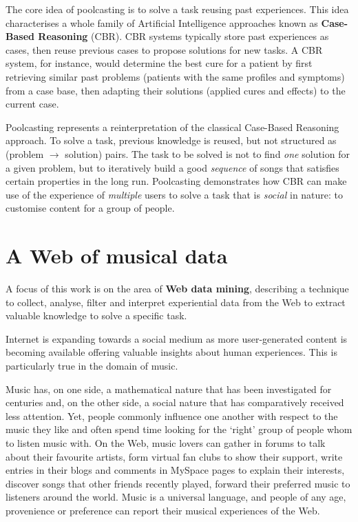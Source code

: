 The core idea of poolcasting is to solve a task reusing past experiences. This idea characterises a whole family of Artificial Intelligence approaches known as \textbf{Case-Based Reasoning} (CBR).
%
CBR systems typically store past experiences as cases, then reuse previous cases to propose solutions for new tasks.
A CBR system, for instance, would determine the best cure for a patient by first retrieving similar past problems (patients with the same profiles and symptoms) from a case base, then adapting their solutions (applied cures and effects) to the current case.

Poolcasting represents a reinterpretation of the classical Case-Based Reasoning approach. To solve a task, previous knowledge is reused, but not structured as (problem $\rightarrow$ solution) pairs.
The task to be solved is not to find \emph{one} solution for a given problem, but to iteratively build a good \emph{sequence} of songs that satisfies certain properties in the long run. 
Poolcasting demonstrates how CBR can make use of the experience of \emph{multiple} users to solve a task that is \emph{social} in nature: to customise content for a group of people.

\section{A Web of musical data} %

A focus of this work is on the area of \textbf{Web data mining}, describing a technique to collect, analyse, filter and interpret experiential data from the Web to extract valuable knowledge to solve a specific task.

Internet is expanding towards a social medium as more user-generated content is becoming available offering valuable insights about human experiences. This is particularly true in the domain of music.

Music has, on one side, a mathematical nature that has been investigated for centuries and, on the other side, a social nature that has comparatively received less attention. Yet, people commonly influence one another with respect to the music they like and often spend time looking for the `right' group of people whom to listen music with.
%
On the Web, music lovers can gather in forums to talk about their favourite artists, form virtual fan clubs to show their support, write entries in their blogs and comments in MySpace pages to explain their interests, discover songs that other friends recently played, forward their preferred music to listeners around the world.
Music is a universal language, and people of any age, provenience or preference can report their musical experiences of the Web.

